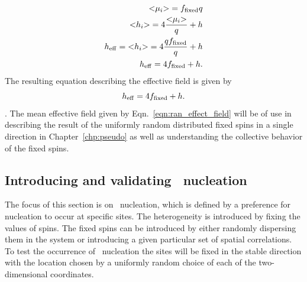 \begin{eqnarray}
{<}\mu_i {>} =  f_{\rm fixed} q \\
{<} h_i {>} = 4 \frac{{<} \mu_i{>}}{q} + h \\
h_{\rm eff} = {<} h_i {>} = 4 \frac{q f_{\rm fixed}}{q} + h \\
h_{\rm  eff} =  4 f_{\rm fixed} + h.
\end{eqnarray}%
The resulting equation describing the effective field is given by 
\begin{equation}
	h_{\rm  eff} =  4 f_{\rm fixed} + h.
	\label{eqn:ran_effect_field}
\end{equation}%
.
The mean effective field given by Eqn.~\ref{eqn:ran_effect_field} will be of use in describing the result of the uniformly random distributed fixed spins in a single direction in Chapter~\ref{chp:pseudo} as well as understanding the collective behavior of the fixed spins.

\subsection{Introducing and validating \het\ nucleation}

The focus of this section  is on \het\ nucleation, which is defined by a preference for nucleation to occur at specific sites.  The heterogeneity is introduced by fixing the values of spins. The fixed spins can be  introduced by either  randomly dispersing them in the system or introducing a given particular set of spatial correlations. To test the occurrence of \het\ nucleation the sites will be fixed in the stable direction with the location chosen by a uniformly random choice of each of the two-dimensional coordinates.

